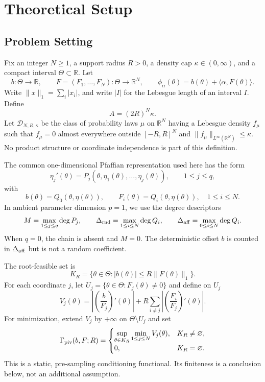 \section{Theoretical Setup}\label{sec:setup}

\subsection{Problem Setting}

Fix an integer $N\geq 1$, a support radius $R>0$, a density cap
$\kappa\in(0,\infty)$, and a compact interval $\Theta\subset\mathbb R$.
Let
\[
b:\Theta\to\mathbb R,
\qquad
F=(F_1,\ldots,F_N):\Theta\to\mathbb R^N,
\qquad
\phi_\alpha(\theta)=b(\theta)+\langle\alpha,F(\theta)\rangle.
\]
Write $\|x\|_1=\sum_i|x_i|$, and write $|I|$ for the Lebesgue length of
an interval $I$.  Define
\[
A=(2R)^N\kappa.
\]
Let $\mathcal D_{N,R,\kappa}$ be the class of probability laws $\mu$ on
$\mathbb R^N$ having a Lebesgue density $f_\mu$ such that $f_\mu=0$
almost everywhere outside $[-R,R]^N$ and
$\|f_\mu\|_{L^\infty(\mathbb R^N)}\leq\kappa$.  No product structure or
coordinate independence is part of this definition.

The common one-dimensional Pfaffian representation used here has the form
\[
\eta_j'(\theta)
=P_j(\theta,\eta_1(\theta),\ldots,\eta_j(\theta)),
\qquad 1\leq j\leq q,
\]
with
\[
b(\theta)=Q_0(\theta,\eta(\theta)),
\qquad
F_i(\theta)=Q_i(\theta,\eta(\theta)),
\quad 1\leq i\leq N.
\]
In ambient parameter dimension $p=1$, we use the degree descriptors
\[
M=\max_{1\leq j\leq q}\deg P_j,
\qquad
\Delta_{\rm rnd}=\max_{1\leq i\leq N}\deg Q_i,
\qquad
\Delta_{\rm aff}=\max_{0\leq i\leq N}\deg Q_i.
\]
When $q=0$, the chain is absent and $M=0$.  The deterministic offset $b$
is counted in $\Delta_{\rm aff}$ but is not a random coefficient.

The root-feasible set is
\[
K_R=\{\theta\in\Theta:|b(\theta)|\leq R\|F(\theta)\|_1\}.
\]
For each coordinate $j$, let
$U_j=\{\theta\in\Theta:F_j(\theta)\neq0\}$ and define on $U_j$
\[
V_j(\theta)
=\left|\left(\frac b{F_j}\right)'(\theta)\right|
+R\sum_{i\neq j}
 \left|\left(\frac{F_i}{F_j}\right)'(\theta)\right|.
\]
For minimization, extend $V_j$ by $+\infty$ on $\Theta\setminus U_j$ and
set
\[
\Gamma_{\rm piv}(b,F;R)
=
\begin{cases}
\displaystyle
\sup_{\theta\in K_R}\min_{1\leq j\leq N}V_j(\theta),
&K_R\neq\varnothing,\\[1ex]
0,&K_R=\varnothing.
\end{cases}
\]
This is a static, pre-sampling conditioning functional.  Its finiteness is
a conclusion below, not an additional assumption.

